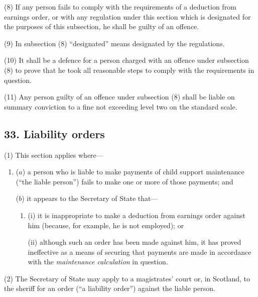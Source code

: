 \documentclass[12pt,a4paper]{article}
\begin{document}
(8) If any person fails to comply with the requirements of a deduction from earnings order, or with any regulation under this section which is designated for the purposes of this subsection, he shall be guilty of an offence.

(9) In subsection (8)  “designated” means designated by the regulations.

(10) It shall be a defence for a person charged with an offence under subsection (8)  to prove that he took all reasonable steps to comply with the requirements in question.

(11) Any person guilty of an offence under subsection (8)  shall be liable on summary conviction to a fine not exceeding level two on the standard scale.


\subsection{33. Liability orders}

(1) This section applies where—
\begin{enumerate}\item[]
($a$) a person who is liable to make payments of child support maintenance (“the liable person”) fails to make one or more of those payments; and

($b$) it appears to the Secretary of State that—
\begin{enumerate}\item[]
(i) it is inappropriate to make a deduction from earnings order against him (because, for example, he is not employed); or

(ii) although such an order has been made against him, it has proved ineffective as a means of securing that payments are made in accordance with the 
\emph{maintenance calculation}  %
in question.
\end{enumerate}
\end{enumerate}

(2) The Secretary of State may apply to a magistrates' court or, in Scotland, to the sheriff for an order (“a liability order”) against the liable person.
\end{document}
